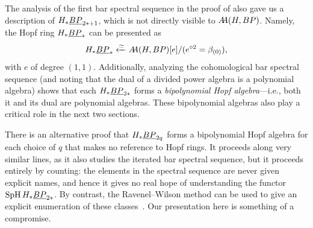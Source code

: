 \begin{remark}
The analysis of the first bar spectral sequence in the proof of  also gave us a description of \(H_* \OS{BP}{2*+1}\), which is not directly visible to \(\AA(H, BP)\).
Namely, the Hopf ring \(H_* \OS{BP}{*}\) can be presented as \[H_* \OS{BP}{*} \xleftarrow{\simeq} \AA(H, BP)[e] / (e^{\circ 2} = \beta_{(0)}),\] with \(e\) of degree \((1, 1)\).
Additionally, analyzing the cohomological bar spectral sequence (and noting that the dual of a divided power algebra is a polynomial algebra) shows that each \(H_* \OS{BP}{2*}\) forms a \textit{bipolynomial Hopf algebra}---i.e., both it and its dual are polynomial algebras.
These bipolynomial algebras also play a critical role in the next two sections.
\end{remark}

\begin{remark}
There is an alternative proof that \(H_* \OS{BP}{2q}\) forms a bipolynomial Hopf algebra for each choice of \(q\) that makes no reference to Hopf rings.
It proceeds along very similar lines, as it also studies the iterated bar spectral sequence, but it proceeds entirely by counting: the elements in the spectral sequence are never given explicit names, and hence it gives no real hope of understanding the functor \(\SpH H_* \OS{BP}{2*}\).
By contrast, the Ravenel--Wilson method can be used to give an explicit enumeration of these classes~\cite[Section 5]{RavenelWilsonHopfRingForMU}.
Our presentation here is something of a compromise.
\end{remark}

